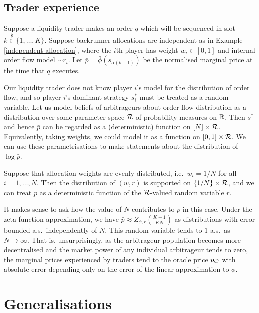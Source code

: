 \subsection{Trader experience}
%
Suppose a liquidity trader makes an order $q$ which will be sequenced in slot $k\stackrel{\$}{\in}\{1,\ldots,K\}$.
%
Suppose backrunner allocations are independent as in Example \ref{independent-allocation}, where the $i$th player has weight $w_i\in[0,1]$ and internal order flow model $\sim r_i$.
%
Let $\bar p=\bar\phi(s_{\alpha(k-1)})$ be the normalised marginal price at the time that $q$ executes.

Our liquidity trader does not know player $i$'s model for the distribution of order flow, and so player $i$'s dominant strategy $s_i^*$ must be treated as a random variable.
%
Let us model beliefs of arbitrageurs about order flow distribution as a distribution over some parameter space $\mathcal{R}$ of probability measures on $\mathbb R$.
%
Then $s^*$ and hence $\bar p$ can be regarded as a (deterministic) function on $[N]\times\mathcal{R}$.
%
Equivalently, taking weights, we could model it as a function on $[0,1]\times\mathcal{R}$.
%
We can use these parametrisations to make statements about the distribution of $\log\bar p$.

\begin{example}

  Suppose that allocation weights are evenly distributed, i.e.~$w_i=1/N$ for all $i=1,\ldots,N$.
  Then the distribution of $(w,r)$ is supported on $\{1/N\}\times\mathcal{R}$, and we can treat $\bar p$ as a deterministic function of the $\mathcal{R}$-valued random variable $r$.
  
  It makes sense to ask how the value of $N$ contributes to $\bar p$ in this case.
  Under the zeta function approximation, we have $\bar p\approx Z_{\phi,r}\left(\frac{K+1}{KN}\right)$ as distributions with error bounded a.s.~independently of $N$.
  This random variable tends to $1$ a.s.~as $N\rightarrow\infty$.
  That is, unsurprisingly, as the arbitrageur population becomes more decentralised and the market power of any individual arbitrageur tends to zero, the marginal prices experienced by traders tend to the oracle price $p_{\mathcal{O}}$ with absolute error depending only on the error of the linear approximation to $\phi$.

\end{example}



\section{Generalisations}

